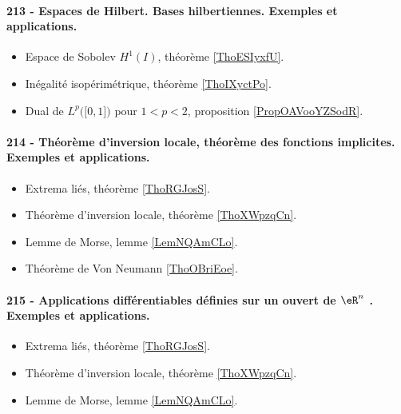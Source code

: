 \paragraph{213 - Espaces de Hilbert. Bases hilbertiennes. Exemples et applications.}
\begin{itemize}
    \item Espace de Sobolev \( H^1(I)\), théorème \ref{ThoESIyxfU}.
    \item Inégalité isopérimétrique, théorème \ref{ThoIXyctPo}.
    \item Dual de \( L^p\big( \mathopen[ 0 , 1 \mathclose] \big)\) pour \( 1<p<2\), proposition \ref{PropOAVooYZSodR}.
\end{itemize}
\paragraph{214 - Théorème d’inversion locale, théorème des fonctions implicites. Exemples et applications.}
\begin{itemize}
    \item Extrema liés, théorème \ref{ThoRGJosS}.
    \item Théorème d'inversion locale, théorème \ref{ThoXWpzqCn}.
    \item Lemme de Morse, lemme \ref{LemNQAmCLo}.
    \item Théorème de Von Neumann \ref{ThoOBriEoe}.
\end{itemize}
\paragraph{215 - Applications différentiables définies sur un ouvert de $\eR^n$ . Exemples et applications.}
\begin{itemize}
    \item Extrema liés, théorème \ref{ThoRGJosS}.
    \item Théorème d'inversion locale, théorème \ref{ThoXWpzqCn}.
    \item Lemme de Morse, lemme \ref{LemNQAmCLo}.
\end{itemize}
